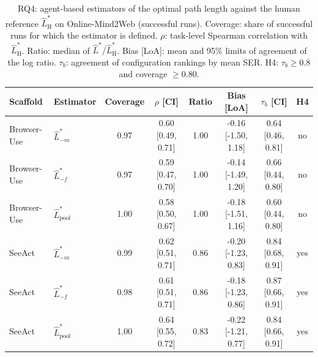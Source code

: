 \begin{table}[t]
\centering
\caption{RQ4: agent-based estimators of the optimal path length against the human reference
$\hat L^{*}_{\mathrm{H}}$ on Online-Mind2Web (successful runs). Coverage: share of successful runs for which the
estimator is defined. $\rho$: task-level Spearman correlation with $\hat L^{*}_{\mathrm{H}}$. Ratio: median of
$\hat L^{*}/\hat L^{*}_{\mathrm{H}}$. Bias [LoA]: mean and 95\% limits of agreement of the log ratio. $\tau_b$:
agreement of configuration rankings by mean SER. H4: $\tau_b \ge 0.8$ and coverage $\ge 0.80$.}
\label{tab:rq4}
\footnotesize
\setlength{\tabcolsep}{3.5pt}
\begin{tabular}{@{}llcccccc@{}}
\toprule
Scaffold & Estimator & Coverage & $\rho$ [CI] & Ratio & Bias [LoA] & $\tau_b$ [CI] & H4 \\
\midrule
Browser-Use & $\hat L^{*}_{-m}$ & 0.97 & 0.60 [0.49, 0.71] & 1.00 & -0.16 [-1.50, 1.18] & 0.64 [0.46, 0.81] & no \\
Browser-Use & $\hat L^{*}_{-f}$ & 0.97 & 0.59 [0.47, 0.70] & 1.00 & -0.14 [-1.49, 1.20] & 0.66 [0.44, 0.80] & no \\
Browser-Use & $\hat L^{*}_{\mathrm{pool}}$ & 1.00 & 0.58 [0.50, 0.67] & 1.00 & -0.18 [-1.51, 1.16] & 0.60 [0.44, 0.80] & no \\
SeeAct & $\hat L^{*}_{-m}$ & 0.99 & 0.62 [0.51, 0.71] & 0.86 & -0.20 [-1.23, 0.83] & 0.84 [0.68, 0.91] & yes \\
SeeAct & $\hat L^{*}_{-f}$ & 0.98 & 0.61 [0.51, 0.71] & 0.86 & -0.18 [-1.23, 0.86] & 0.87 [0.66, 0.91] & yes \\
SeeAct & $\hat L^{*}_{\mathrm{pool}}$ & 1.00 & 0.64 [0.55, 0.72] & 0.83 & -0.22 [-1.21, 0.77] & 0.84 [0.66, 0.91] & yes \\
\bottomrule
\end{tabular}
\end{table}
